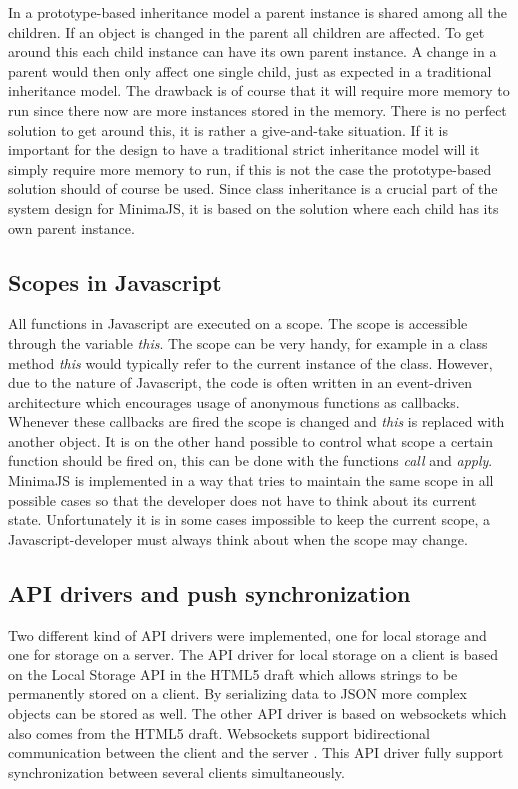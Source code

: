 In a prototype-based inheritance model a parent instance is shared among all the children. If an object is changed in the parent all children are affected. To get around this each child instance can have its own parent instance. A change in a parent would then only affect one single child, just as expected in a traditional inheritance model. The drawback is of course that it will require more memory to run since there now are more instances stored in the memory. There is no perfect solution to get around this, it is rather a give-and-take situation. If it is important for the design to have a traditional strict inheritance model will it simply require more memory to run, if this is not the case the prototype-based solution should of course be used. Since class inheritance is a crucial part of the system design for MinimaJS, it is based on the solution where each child has its own parent instance.

\subsection{Scopes in Javascript}

All functions in Javascript are executed on a scope. The scope is accessible through the variable {\em this}. The scope can be very handy, for example in a class method {\em this} would typically refer to the current instance of the class. However, due to the nature of Javascript, the code is often written in an event-driven architecture which encourages usage of anonymous functions as callbacks. Whenever these callbacks are fired the scope is changed and {\em this} is replaced with another object. It is on the other hand possible to control what scope a certain function should be fired on, this can be done with the functions {\em call} and {\em apply}. MinimaJS is implemented in a way that tries to maintain the same scope in all possible cases so that the developer does not have to think about its current state. Unfortunately it is in some cases impossible to keep the current scope, a Javascript-developer must always think about when the scope may change.

\subsection{API drivers and push synchronization}

Two different kind of API drivers were implemented, one for local storage and one for storage on a server. The API driver for local storage on a client is based on the Local Storage API in the HTML5 draft which allows strings to be permanently stored on a client. By serializing data to JSON more complex objects can be stored as well. The other API driver is based on websockets which also comes from the HTML5 draft. Websockets support bidirectional communication between the client and the server \cite{websocket_draft}. This API driver fully support synchronization between several clients simultaneously.

